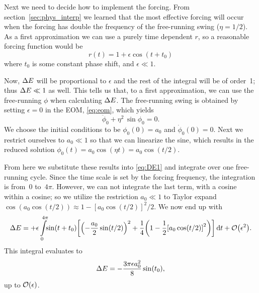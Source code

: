 Next we need to decide how to implement the forcing. From
section~\ref{sec:phys_interp} we learned that the most effective
forcing will occur when the forcing has double the frequency of the
free-running swing ($\eta=1/2$). As a first approximation we can use a
purely time dependent $r$, so a reasonable forcing function would be
\begin{equation}
r(t)=1+\epsilon\cos(t+t_0)
\end{equation}
where $t_0$ is some constant phase shift, and $\epsilon\ll1$. 

Now, $\Delta{E}$ will be proportional to $\epsilon$ and the rest of the
integral will be of order~1; thus $\Delta{E}\ll1$ as well. This tells us
that, to a first approximation, we can use the free-running $\phi$
when calculating $\Delta{E}$. The free-running swing is 
obtained by setting $\epsilon=0$ in the EOM, \eqref{eq:eom}, which
yields
\begin{equation}
\ddot\phi_0+\eta^2\,\sin\phi_0=0.
\end{equation}
We choose the initial conditions to be $\phi_0(0)=a_0$ and
$\dot\phi_0(0)=0$. Next we restrict ourselves to $a_0\ll1$ so that we
can linearize the sine, which results in the reduced solution
$\phi_0(t)=a_0\cos(\eta t)=a_0\cos(t/2)$.

From here we substitute these results into \eqref{eq:DE1} and
integrate over one free-running cycle. Since the time scale is set by
the forcing frequency, the integration is from~$0$ to~$4\pi$. However,
we can not integrate the last term, with a cosine within a cosine; so
we utilize the restriction $a_0\ll1$ to Taylor expand
$\cos(a_0\cos(t/2))\approx1-[a_0\cos(t/2)]^2/2$. 
We now end up with 
\begin{equation}
\DE=+\epsilon\int_0^{4\pi}\!\!\sin(t+t_0)
\qty[\qty(-\frac{a_0}{2}\sin(t/2))^2
+\frac{1}{4}\qty(1-\frac{1}{2}\qty[a_0\cos(t/2)]^2)
]\id{t}+\order{\epsilon^2}.
\end{equation}
This integral evaluates to
\begin{equation}\label{eq:DE_t0}
\DE%
=-\frac{3\pi\epsilon a_0^2}{8}\sin(t_0),
\end{equation}
up to $\order{\epsilon}$.


